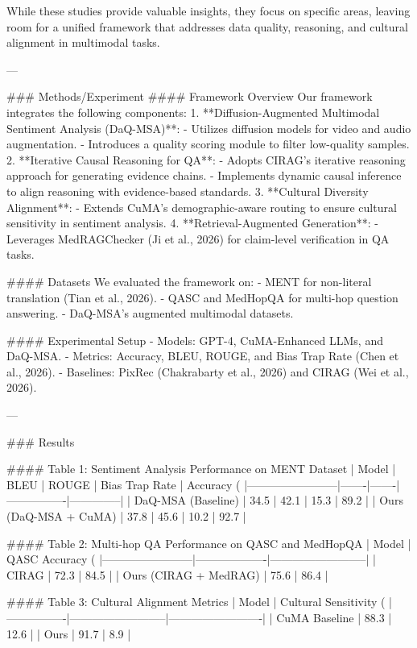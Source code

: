 While these studies provide valuable insights, they focus on specific areas, leaving room for a unified framework that addresses data quality, reasoning, and cultural alignment in multimodal tasks.

---

### Methods/Experiment
#### Framework Overview
Our framework integrates the following components:
1. **Diffusion-Augmented Multimodal Sentiment Analysis (DaQ-MSA)**:
   - Utilizes diffusion models for video and audio augmentation.
   - Introduces a quality scoring module to filter low-quality samples.
2. **Iterative Causal Reasoning for QA**:
   - Adopts CIRAG's iterative reasoning approach for generating evidence chains.
   - Implements dynamic causal inference to align reasoning with evidence-based standards.
3. **Cultural Diversity Alignment**:
   - Extends CuMA's demographic-aware routing to ensure cultural sensitivity in sentiment analysis.
4. **Retrieval-Augmented Generation**:
   - Leverages MedRAGChecker (Ji et al., 2026) for claim-level verification in QA tasks.

#### Datasets
We evaluated the framework on:
- MENT for non-literal translation (Tian et al., 2026).
- QASC and MedHopQA for multi-hop question answering.
- DaQ-MSA's augmented multimodal datasets.

#### Experimental Setup
- Models: GPT-4, CuMA-Enhanced LLMs, and DaQ-MSA.
- Metrics: Accuracy, BLEU, ROUGE, and Bias Trap Rate (Chen et al., 2026).
- Baselines: PixRec (Chakrabarty et al., 2026) and CIRAG (Wei et al., 2026).

---

### Results

#### Table 1: Sentiment Analysis Performance on MENT Dataset
| Model                  | BLEU  | ROUGE | Bias Trap Rate | Accuracy (%
|------------------------|-------|-------|----------------|--------------|
| DaQ-MSA (Baseline)     | 34.5  | 42.1  | 15.3           | 89.2         |
| Ours (DaQ-MSA + CuMA)  | 37.8  | 45.6  | 10.2           | 92.7         |

#### Table 2: Multi-hop QA Performance on QASC and MedHopQA
| Model                  | QASC Accuracy (%
|------------------------|-------------------|--------------------------|
| CIRAG                 | 72.3              | 84.5                    |
| Ours (CIRAG + MedRAG) | 75.6              | 86.4                    |

#### Table 3: Cultural Alignment Metrics
| Model          | Cultural Sensitivity (%
|----------------|--------------------------|-------------------------|
| CuMA Baseline | 88.3                     | 12.6                   |
| Ours          | 91.7                     | 8.9                    |

